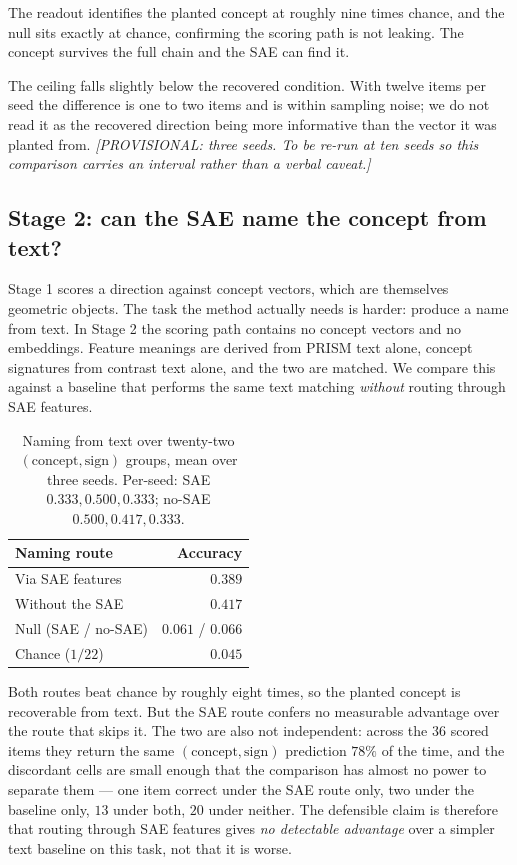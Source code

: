 The readout identifies the planted concept at roughly nine times chance, and the
null sits exactly at chance, confirming the scoring path is not leaking. The
concept survives the full chain and the SAE can find it.

The ceiling falls slightly below the recovered condition. With twelve items per
seed the difference is one to two items and is within sampling noise; we do not
read it as the recovered direction being more informative than the vector it was
planted from. \emph{[PROVISIONAL: three seeds. To be re-run at ten seeds so this
comparison carries an interval rather than a verbal caveat.]}

\subsection{Stage 2: can the SAE name the concept from text?}

Stage 1 scores a direction against concept vectors, which are themselves
geometric objects. The task the method actually needs is harder: produce a name
from text. In Stage 2 the scoring path contains no concept vectors and no
embeddings. Feature meanings are derived from PRISM text alone, concept
signatures from contrast text alone, and the two are matched. We compare this
against a baseline that performs the same text matching \emph{without} routing
through SAE features.

\begin{table}[h]
\centering
\begin{tabular}{lr}
\toprule
Naming route & Accuracy \\
\midrule
Via SAE features       & $0.389$ \\
Without the SAE        & $0.417$ \\
\midrule
Null (SAE / no-SAE)    & $0.061$ / $0.066$ \\
Chance ($1/22$)        & $0.045$ \\
\bottomrule
\end{tabular}
\caption{Naming from text over twenty-two $(\text{concept},\text{sign})$ groups,
mean over three seeds. Per-seed: SAE $0.333, 0.500, 0.333$; no-SAE $0.500,
0.417, 0.333$.}
\label{tab:planted-naming}
\end{table}

Both routes beat chance by roughly eight times, so the planted concept is
recoverable from text. But the SAE route confers no measurable advantage over
the route that skips it. The two are also not independent: across the $36$
scored items they return the same $(\text{concept},\text{sign})$ prediction
$78\%$ of the time, and the discordant cells are small enough that the
comparison has almost no power to separate them --- one item correct under the
SAE route only, two under the baseline only, $13$ under both, $20$ under
neither. The defensible claim is therefore that routing through SAE features
gives \emph{no detectable advantage} over a simpler text baseline on this task,
not that it is worse.

